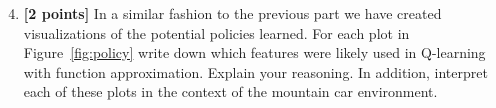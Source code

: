 \begin{enumerate}
\setcounter{enumi}{3}
\item \textbf{[2 points]} In a similar fashion to the previous part we have created visualizations of the potential policies learned. For each plot in Figure~\ref{fig:policy} write down which features were likely used in Q-learning with function approximation. Explain your reasoning. In addition, interpret each of these plots in the context of the mountain car environment.
    
\begin{tcolorbox}[fit,height=4cm, width=\linewidth, blank, borderline={1pt}{-2pt},nobeforeafter]
\end{tcolorbox}

\end{enumerate}